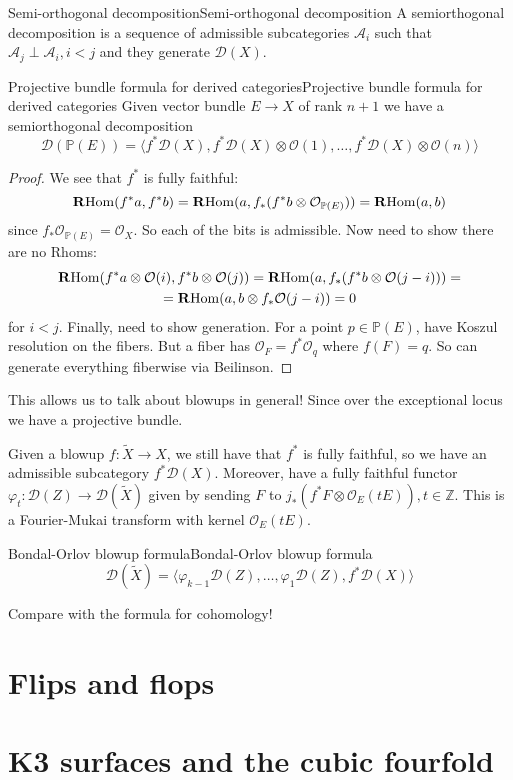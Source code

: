 \begin{definition}{Semi-orthogonal decomposition}{Semi-orthogonal decomposition}
    A semiorthogonal decomposition is a sequence of admissible subcategories $\mathcal{A}_{i}$ such that $\mathcal{A}_{j}\perp \mathcal{A}_{i}, i<j$ and they generate $\mathcal{D}(X)$.
\end{definition}


\begin{proposition}{Projective bundle formula for derived categories}{Projective bundle formula for derived categories}
    Given vector bundle $E\rightarrow X$ of rank $n+1$ we have a semiorthogonal decomposition $$\mathcal{D}(\mathbb{P}(E))=\langle f^*\mathcal{D}(X), f^*\mathcal{D}(X)\otimes \mathcal{O}(1),\dots, f^*\mathcal{D}(X)\otimes \mathcal{O}(n)\rangle$$
\end{proposition}

\begin{proof}
    We see that $f^*$ is fully faithful: $$\operatorname{\mathbf{R}Hom}(f^*a,f^*b)=\operatorname{\mathbf{R}Hom}(a, f_{*} (f^*b\otimes \mathcal{O}_{\mathbb{P}(E)}))=\operatorname{\mathbf{R}Hom}(a, b)$$since $f_*\mathcal{O}_{\mathbb{P}(E)}=\mathcal{O}_{X}$. So each of the bits is admissible. Now need to show there are no Rhoms: $$\begin{gathered}
\operatorname{\mathbf{R}Hom}(f^*a\otimes \mathcal{O}(i), f^*b\otimes \mathcal{O}(j))=\operatorname{\mathbf{R}Hom}(a, f_{*}(f^*b\otimes \mathcal{O}(j-i)))=\\
=\operatorname{\mathbf{R}Hom}(a, b\otimes f_{*}\mathcal{O}(j-i))=0
\end{gathered}$$for $i<j$. Finally, need to show generation. For a point $p\in \mathbb{P}(E)$, have Koszul resolution on the fibers. But a fiber has $\mathcal{O}_{F}=f^*\mathcal{O}_{q}$ where $f(F)=q$. So can generate everything fiberwise via Beilinson.  
\end{proof}

This allows us to talk about blowups in general! Since over the exceptional locus we have a projective bundle. 

Given a blowup $f:\tilde{X}\xrightarrow{}X$, we still have that $f^*$ is fully faithful, so we have an admissible subcategory $f^*\mathcal{D}(X)$. Moreover, have a fully faithful functor $\varphi_{t}:\mathcal{D}(Z)\xrightarrow{}\mathcal{D}(\tilde{X})$ given by sending $F$ to $j_{*}(f^*F\otimes \mathcal{O}_{E}(tE)), t\in \mathbb{Z}$. This is a Fourier-Mukai transform with kernel $\mathcal{O}_{E}(tE)$.


\begin{theorem}{Bondal-Orlov blowup formula}{Bondal-Orlov blowup formula}
    $$\mathcal{D}(\tilde{X})=\langle \varphi_{{k-1}}\mathcal{D}(Z),\dots,\varphi_{1}\mathcal{D}(Z), f^*\mathcal{D}(X)\rangle$$
\end{theorem}

Compare with the formula for cohomology!


\section{Flips and flops}


\section{K3 surfaces and the cubic fourfold}


